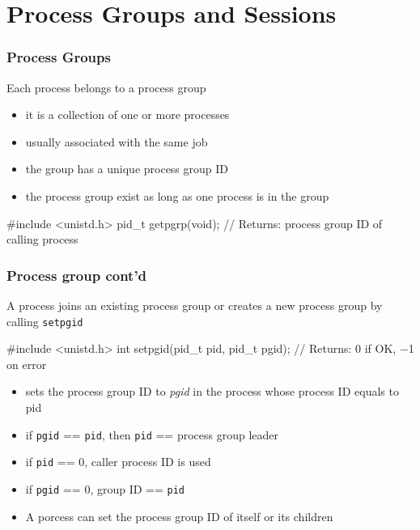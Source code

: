 \documentclass[newPxFont,sthlmFooter,nooffset]{beamer}
\begin{document}
\section{Process Groups and Sessions}

\begin{frame}[containsverbatim,t]
  \frametitle{Process Groups}
Each process belongs to a process group
\begin{itemize}
\item it is a collection of one or more processes
\item usually associated with the same job
\item the group has a unique process group ID
\item the process group exist as long as one process is in the group
\end{itemize}
  
\begin{codedef}
#include <unistd.h>
pid_t getpgrp(void);
// Returns: process group ID of calling process
\end{codedef}

\end{frame}

\begin{frame}[containsverbatim,t]
  \frametitle{Process group cont'd}
A process joins an existing process group or creates a new process group by calling \texttt{setpgid}
\begin{codedef}
#include <unistd.h>
int setpgid(pid_t pid, pid_t pgid);
// Returns: 0 if OK, −1 on error
\end{codedef}

\begin{itemize}
\item sets the process group ID to \textit{pgid} in the process whose process ID equals to pid
\item if \texttt{pgid} == \texttt{pid}, then \texttt{pid} == process group leader
\item if \texttt{pid} == 0, caller process ID is used
\item if \texttt{pgid} == 0, group ID == \texttt{pid} 
\item A porcess can set the process group ID of itself or its children
\end{itemize}
\end{frame}
\end{document}
